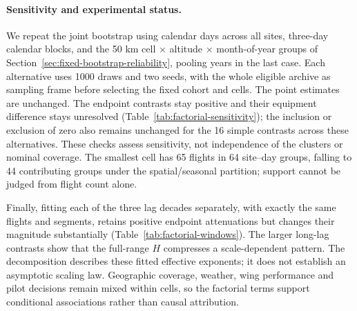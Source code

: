 \paragraph{Sensitivity and experimental status.}
We repeat the joint bootstrap using calendar days across all sites, three-day
calendar blocks, and the 50 km cell $\times$ altitude $\times$ month-of-year
groups of Section~\ref{sec:fixed-bootstrap-reliability}, pooling years in the
last case. Each alternative uses 1000 draws and two seeds, with the whole
eligible archive as sampling frame before selecting the fixed cohort and cells.
The point estimates are unchanged. The endpoint contrasts stay positive and
their equipment difference stays unresolved (Table~\ref{tab:factorial-sensitivity});
the inclusion or exclusion of zero also remains unchanged for the 16 simple
contrasts across these alternatives. These checks assess sensitivity, not
independence of the clusters or nominal coverage. The smallest cell has 65
flights in 64 site--day groups, falling to 44 contributing groups under the
spatial/seasonal partition; support cannot be judged from flight count alone.

\begin{table}[htbp]
 \centering\small
 
 \caption{Experimental resampling sensitivity over 10--10000 s. Intervals use
 the same family of 19 contrasts. For each alternative the displayed endpoints
 enclose the two seed-specific simultaneous intervals; this envelope is a
 sensitivity summary, not a separately calibrated confidence interval.}
 \label{tab:factorial-sensitivity}
\end{table}

Finally, fitting each of the three lag decades separately, with exactly the
same flights and segments, retains positive endpoint attenuations but changes
their magnitude substantially (Table~\ref{tab:factorial-windows}). The larger
long-lag contrasts show that the full-range $H$ compresses a scale-dependent
pattern. The decomposition describes these fitted effective exponents; it does
not establish an asymptotic scaling law. Geographic coverage, weather, wing
performance and pilot decisions remain mixed within cells, so the factorial
terms support conditional associations rather than causal attribution.

\begin{table}[htbp]
 \centering\small
 
 \caption{Experimental fit-window sensitivity, keeping $\mathcal C_{10000}$
 and its retained segments fixed. All entries are point estimates; RMS denotes
 $R_{\rm rms}$. The endpoint interaction contrasts $D_{\rm B}$ and $D_{\rm E}$
 are defined after Eq.~\eqref{eq:factorial-simple}.}
 \label{tab:factorial-windows}
\end{table}
\FloatBarrier


